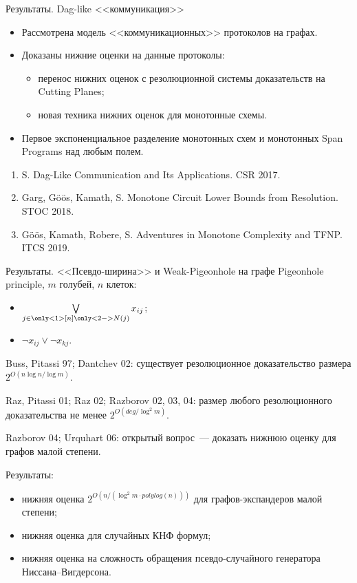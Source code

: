 \begin{frame}{Результаты. Dag-like <<коммуникация>>}
    \begin{itemize}
        \pause    
        \item Рассмотрена модель <<коммуникационных>> протоколов на графах.
        \pause
        \item Доказаны нижние оценки на данные протоколы:
            \begin{itemize}
                \item перенос нижних оценок с резолюционной системы доказательств на Cutting Planes;
                \item новая техника нижних оценок для монотонные схемы.
            \end{itemize}
        \pause
        \item Первое экспоненциальное разделение монотонных схем и монотонных Span Programs над любым
            полем.
    \end{itemize}

    \pause

    \begin{enumerate}
        \item S. Dag-Like Communication and Its Applications. CSR 2017.
        \item Garg, G\"{o}\"{o}s, Kamath, S. Monotone Circuit Lower Bounds from Resolution. STOC 2018.
        \item G\"{o}\"{o}s, Kamath, Robere, S. Adventures in Monotone Complexity and TFNP. ITCS 2019.
    \end{enumerate}
\end{frame}

\begin{frame}{Результаты. <<Псевдо-ширина>> и Weak-Pigeonhole на графе}
    Pigeonhole principle, $m$ голубей, $n$ клеток:
    \begin{itemize}
        \item $\bigvee\limits_{j \in \only<1>{[n]} \only<2->{N(j)}} x_{ij}$;
        \item $\neg x_{ij} \lor \neg x_{kj}$.
    \end{itemize}

    \pause
    \pause
    Buss, Pitassi 97; Dantchev 02: существует резолюционное доказательство размера
    $2^{O(n \log n / \log m)}$.

    \pause
    Raz, Pitassi 01; Raz 02; Razborov 02, 03, 04: размер любого резолюционного доказательства не менее
    $2^{O(deg / \log^2 m)}$.

    \pause
    Razborov 04; Urquhart 06: открытый вопрос~--- доказать нижнюю оценку для графов малой степени.

    \pause
    Результаты:
    \begin{itemize}
        \item нижняя оценка $2^{O(n / (\log^2 m \cdot polylog(n)))}$ для графов-экспандеров малой степени;
        \item нижняя оценка для случайных КНФ формул;
        \item нижняя оценка на сложность обращения псевдо-случайного генератора Ниссана--Вигдерсона.
    \end{itemize}
\end{frame}


